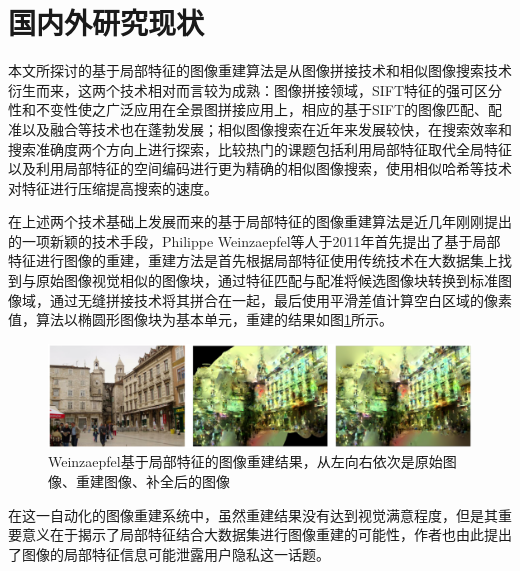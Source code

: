 \section{国内外研究现状}

本文所探讨的基于局部特征的图像重建算法是从图像拼接技术和相似图像搜索技术衍生而来，这两个技术相对而言较为成熟：图像拼接领域，SIFT特征的强可区分性和不变性使之广泛应用在全景图拼接应用上\cite{Brown:2006ir}，相应的基于SIFT的图像匹配、配准以及融合等技术也在蓬勃发展；相似图像搜索在近年来发展较快，在搜索效率和搜索准确度两个方向上进行探索，比较热门的课题包括利用局部特征取代全局特征\cite{Xu:2013wc,POLICY:2013te,Wu:2009bl}以及利用局部特征的空间编码\cite{Zhou:2010tv}进行更为精确的相似图像搜索，使用相似哈希等技术对特征进行压缩\cite{Chum:2008jo}提高搜索的速度。

在上述两个技术基础上发展而来的基于局部特征的图像重建算法是近几年刚刚提出的一项新颖的技术手段，Philippe Weinzaepfel等人于2011年首先提出了基于局部特征进行图像的重建\cite{Weinzaepfel:2011jh}，重建方法是首先根据局部特征使用传统技术在大数据集上找到与原始图像视觉相似的图像块，通过特征匹配与配准将候选图像块转换到标准图像域，通过无缝拼接技术将其拼合在一起，最后使用平滑差值计算空白区域的像素值，算法以椭圆形图像块为基本单元，重建的结果如图\ref{fig:Weinzaepfel_res}所示。

\begin{figure}
\centering\includegraphics[width=15cm]{imgs/ch1/Weinzaepfel_res}
\caption{Weinzaepfel基于局部特征的图像重建结果，从左向右依次是原始图像、重建图像、补全后的图像}
\label{fig:Weinzaepfel_res}
\end{figure}

在这一自动化的图像重建系统中，虽然重建结果没有达到视觉满意程度，但是其重要意义在于揭示了局部特征结合大数据集进行图像重建的可能性，作者也由此提出了图像的局部特征信息可能泄露用户隐私这一话题。

